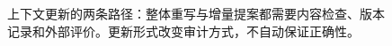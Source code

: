 \begin{figure}[htbp]
\centering

\caption{上下文更新的两条路径：整体重写与增量提案都需要内容检查、版本记录和外部评价。更新形式改变审计方式，不自动保证正确性。}
\label{fig:ch07-context}
\end{figure}
